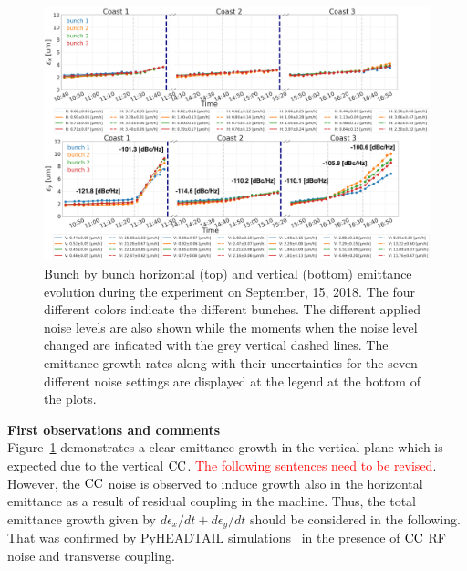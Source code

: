 \begin{figure}
   \centering
   \includegraphics[width=1.0\textwidth]{images/Ch5/MD5_overview_x_y.png}
   \caption{Bunch by bunch horizontal (top) and vertical (bottom) emittance evolution during the experiment on September, 15, 2018. The four different colors indicate the different bunches. The different applied noise levels are also shown while the moments when the noise level changed are inficated with the grey vertical dashed lines. The emittance growth rates along with their uncertainties for the seven different noise settings are displayed at the legend at the bottom of the plots.}
   \label{fig:MD5_overview_x_y}
\end{figure}
   
\textbf{First observations and comments}\\
Figure~\ref{fig:MD5_overview_x_y} demonstrates a clear emittance growth in the vertical plane which is expected due to the vertical ${\mathrm{CC}}$. \textcolor{red}{The following sentences need to be revised}. However, the ${\mathrm{CC}}$ noise is observed to induce growth also in the horizontal emittance as a result of residual coupling in the machine. Thus, the total emittance growth given by $d\epsilon_x/dt + d\epsilon_y/dt$ should be considered in the following. That was confirmed by PyHEADTAIL simulations~\cite{Baudrenghien_HL-LHC19v6} in the presence of ${\mathrm{CC}}$ RF noise and transverse coupling. 



